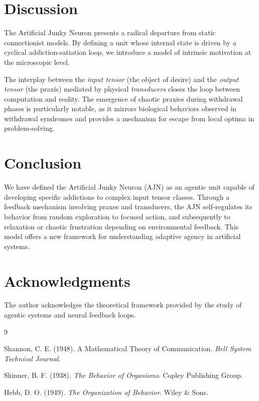 \documentclass[12pt,a4paper]{article}
\begin{document}
\section{Discussion}

The Artificial Junky Neuron presents a radical departure from static connectionist models. By defining a unit whose internal state is driven by a cyclical addiction-satiation loop, we introduce a model of intrinsic motivation at the microscopic level.

The interplay between the \textit{input tensor} (the object of desire) and the \textit{output tensor} (the praxis) mediated by physical \textit{transducers} closes the loop between computation and reality. The emergence of chaotic praxies during withdrawal phases is particularly notable, as it mirrors biological behaviors observed in withdrawal syndromes and provides a mechanism for escape from local optima in problem-solving.

\section{Conclusion}

We have defined the Artificial Junky Neuron (AJN) as an agentic unit capable of developing specific addictions to complex input tensor classes. Through a feedback mechanism involving praxes and transducers, the AJN self-regulates its behavior from random exploration to focused action, and subsequently to relaxation or chaotic frustration depending on environmental feedback. This model offers a new framework for understanding adaptive agency in artificial systems.

\section*{Acknowledgments}
The author acknowledges the theoretical framework provided by the study of agentic systems and neural feedback loops.

\begin{thebibliography}{9}

Shannon, C. E. (1948).
A Mathematical Theory of Communication.
\textit{Bell System Technical Journal}.

Skinner, B. F. (1938).
\textit{The Behavior of Organisms}.
Copley Publishing Group.

Hebb, D. O. (1949).
\textit{The Organization of Behavior}.
Wiley \& Sons.

\end{thebibliography}
\end{document}

